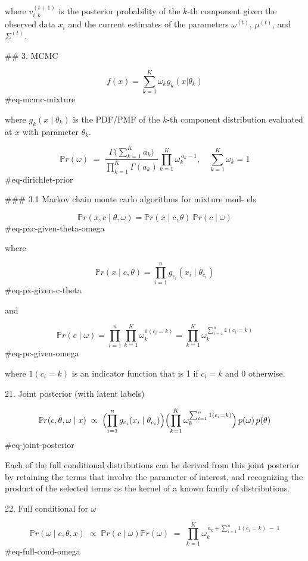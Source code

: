 where $v_{i,k}^{(t+1)}$ is the posterior probability of the $k$-th component given the observed data $x_i$ and the current estimates of the parameters $\omega^{(t)}$, $\mu^{(t)}$, and $\Sigma^{(t)}$.


## 3. MCMC

$$
f(x) = \sum_{k=1}^K \omega_k g_k(x | \theta_k)
$$ {#eq-mcmc-mixture}

where $g_k(x \mid \theta_k)$ is the PDF/PMF of the $k$-th component distribution evaluated at $x$ with parameter $\theta_k$.

$$
\mathbb{P}r(\omega) \;=\;
\frac{\Gamma \bigl ( \sum_{k=1}^K a_k \bigr ) }{\prod_{k=1}^K \Gamma(a_k)}
\prod_{k=1}^K \omega_k^{\,a_k-1},
\quad
\sum_{k=1}^K \omega_k = 1
$$ {#eq-dirichlet-prior}

### 3.1 Markov chain monte carlo algorithms for mixture mod-
els

$$
\mathbb{P}r(x, c \mid \theta, \omega) = \mathbb{P}r(x \mid c, \theta)\ \mathbb{P}r(c \mid \omega)
$$ {#eq-pxc-given-theta-omega}

where 

$$
\mathbb{P}r(x \mid c, \theta) = \prod_{i=1}^n g_{c_i}(x_i \mid \theta_{c_i})
$$ {#eq-px-given-c-theta}

and

$$
\mathbb{P}r(c \mid \omega) = \prod_{i=1}^n \prod_{k=1}^K 
\omega_k ^{\mathbb{1}(c_i = k)} =
\prod_{k=1}^K \omega_k^{\sum_{i=1}^n \mathbb{1}(c_i = k)} 
$$ {#eq-pc-given-omega}

where $1(c_i = k)$ is an indicator function that is 1 if $c_i = k$ and 0 otherwise.

21. Joint posterior (with latent labels)

$$
\mathbb{P}r(c,\theta,\omega \mid x)
\;\propto\;
\Bigl(\prod_{i=1}^n g_{c_i}(x_i\mid \theta_{c_i})\Bigr)
\Bigl(\prod_{k=1}^K \omega_k^{\sum_{i=1}^n1(c_i=k)}\Bigr)
\,p(\omega)\,p(\theta)
$$ {#eq-joint-posterior}

Each of the full conditional distributions can be derived from this joint posterior by retaining the terms that involve the parameter of interest, and recognizing the product of the selected terms as the kernel of a known
family of distributions.

22. Full conditional for $\omega$

$$
\mathbb{P}r(\omega \mid c,\theta,x)
\;\propto\;
\mathbb{P}r(c \mid \omega) \mathbb{P}r(\omega)
\;=\;
\prod_{k=1}^K
\omega_k^{\,a_k + \sum_{i=1}^n1(c_i=k)\;-\;1}
$$ {#eq-full-cond-omega}

